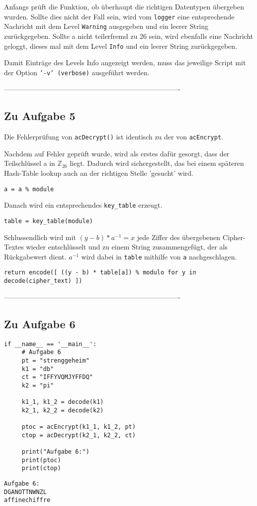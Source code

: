 \documentclass[12pt]{article}
\begin{document}
Anfangs prüft die Funktion, ob überhaupt die richtigen Datentypen übergeben wurden. Sollte dies nicht der Fall sein, wird vom \texttt{logger} eine entsprechende Nachricht mit dem Level \texttt{Warning} ausgegeben und ein leerer String zurückgegeben.
Sollte a nicht teilerfremd zu 26 sein, wird ebenfalls eine Nachricht geloggt, dieses mal mit dem Level \texttt{Info} und ein leerer String zurückgegeben.

Damit Einträge des Levels Info angezeigt werden, muss das jeweilige Script mit der Option \texttt{'-v' (verbose)} ausgeführt werden. 

%
 ----------------------------------------------------------------------------
\subsection{Zu Aufgabe 5}
Die Fehlerprüfung von \texttt{acDecrypt()} ist identisch zu der von \texttt{acEncrypt}. 

Nachdem auf Fehler geprüft wurde, wird als erstes dafür gesorgt, dass der Teilschlüssel a in $\mathbb{Z}_{26}$ liegt. Dadurch wird sichergestellt, das bei einem späteren Hash-Table lookup auch an der richtigen Stelle 'gesucht' wird.
\begin{lstlisting}
a = a % module
\end{lstlisting}

Danach wird ein entsprechendes \texttt{key\_table} erzeugt.
\begin{lstlisting}
table = key_table(module)
\end{lstlisting}

Schlussendlich wird mit $(y - b) * a^{-1} = x$ jede Ziffer des übergebenen Cipher-Textes wieder entschlüsselt und zu einem String zusammengefügt, der als Rückgabewert dient. $a^{-1}$ wird dabei in \texttt{table} mithilfe von \texttt{a} nachgeschlagen.
\begin{lstlisting}
return encode([ ((y - b) * table[a]) % modulo for y in decode(cipher_text) ])
\end{lstlisting}

%
 ----------------------------------------------------------------------------
\subsection{Zu Aufgabe 6}
\begin{lstlisting}
if __name__ == '__main__':
     # Aufgabe 6 
     pt = "strenggeheim"
     k1 = "db"
     ct = "IFFYVQMJYFFDQ"
     k2 = "pi"
 
     k1_1, k1_2 = decode(k1)
     k2_1, k2_2 = decode(k2)
 
     ptoc = acEncrypt(k1_1, k1_2, pt)
     ctop = acDecrypt(k2_1, k2_2, ct)
 
     print("Aufgabe 6:")
     print(ptoc)
     print(ctop)
\end{lstlisting}
\begin{lstlisting}
Aufgabe 6:
DGANOTTNWNZL
affinechiffre
\end{lstlisting}
\end{document}

